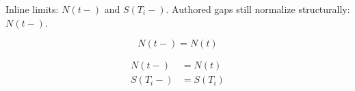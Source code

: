 Inline limits: $N(t-)$ and $S(T_i-)$.
Authored gaps still normalize structurally: $N(t-)$.

\[
  N(t-) = N(t)
\]

\begin{align}
  N(t-)   & = N(t)   \\
  S(T_i-) & = S(T_i)
\end{align}
